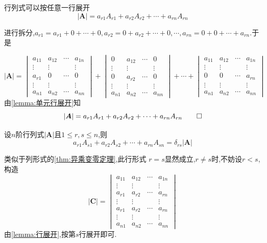 \begin{green}
\begin{lemma}[行展开]\label{lemma:行展开}
    行列式可以按任意一行展开
    \[
    \left|\bm{A}\right|=a_{r1}A_{r1}+a_{r2}A_{r2}+\cdots+a_{rn}A_{rn}
    \]
\end{lemma}
\begin{Proof}
进行拆分,$a_{r1}=a_{r1}+0+\cdots+0,a_{r2}=0+a_{r2}+\cdots+0,\cdots,a_{rn}=0+0+\cdots+a_{rn}$.于是\vfill

\[
\left|\bm{A}\right|=\begin{vmatrix}
    a_{11}&a_{12}&\cdots&a_{1n}\\
    \vdots&\vdots& &\vdots\\
    a_{r1}&0&\cdots&0\\
    \vdots&\vdots& &\vdots\\
    a_{n1}&a_{n2}&\cdots&a_{nn}
\end{vmatrix}+
\begin{vmatrix}
    0&a_{12}&\cdots&0\\
    \vdots&\vdots& &\vdots\\
    0&a_{r2}&\cdots&0\\
    \vdots&\vdots& &\vdots\\
    a_{n1}&a_{n2}&\cdots&a_{nn}
\end{vmatrix}+\cdots+\begin{vmatrix}
    a_{11}&a_{12}&\cdots&a_{1n}\\
    \vdots&\vdots& &\vdots\\
    0&0&\cdots&a_{rn}\\
    \vdots&\vdots& &\vdots\\
    a_{n1}&a_{n2}&\cdots&a_{nn}
\end{vmatrix}
\]由\cref{lemma:单元行展开}知\[
\left|\bm{A}\right|=a_{r1}A_{r1}+a_{r2}A_{r2}+\cdots+a_{rn}A_{rn}\qedhere
\]
\end{Proof}
\end{green}
\begin{green}
\begin{corollary}[异乘变零定理]\label{cor:异乘变零定理}
    设$n$阶行列式$\left|\bm{A}\right|$且$1\leqslant r,s\leqslant n$,则\[
    a_{r1}A_{s1}+a_{r2}A_{s2}+\cdots+a_{rn}A_{sn}=\delta_{rs}\left|\bm{A}\right|
    \]
\end{corollary}
\begin{Proof}
    类似于列形式的\cref{thm:异乘变零定理},此行形式
$r=s$显然成立,$r\neq s$时,不妨设$r<s$,构造\[
\left|\bm{C}\right|=\begin{vmatrix}
    a_{11}&a_{12}&\cdots&a_{1n}\\
    \vdots&\vdots& &\vdots\\
    a_{r1}&a_{r2}&\cdots&a_{rn}\\
    \vdots&\vdots& &\vdots\\
    a_{r1}&a_{r2}&\cdots&a_{rn}\\
    \vdots&\vdots& &\vdots\\
    a_{n1}&a_{n2}&\cdots&a_{nn}
\end{vmatrix}
\]由\cref{lemma:行展开},按第$s$行展开即可.
\end{Proof}
\end{green}
